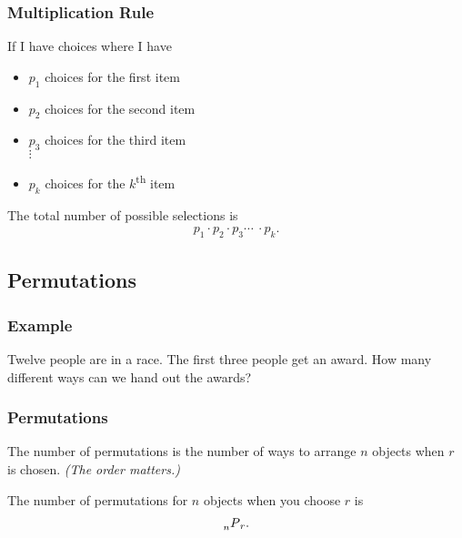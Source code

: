 \begin{frame}
  \frametitle{Multiplication Rule}

  \begin{definition}
    If I have choices where I have
    \begin{itemize}
    \item $p_1$ choices for the first item
    \item $p_2$ choices for the second item
    \item $p_3$ choices for the third item \\
      $\vdots$
    \item $p_k$ choices for the $k$\textsuperscript{th} item \\
    \end{itemize}

    The total number of possible selections is 
    \begin{eqnarray*}
      p_1 \cdot p_2 \cdot p_3 \cdots ~ \cdot p_k.
    \end{eqnarray*}

  \end{definition}

\end{frame}

\subsection{Permutations}

\begin{frame}
  \frametitle{Example}
  Twelve people are in a race. The first three people get an
  award. How many different ways can we hand out the awards?

  \vfill
\end{frame}

\begin{frame}
  \frametitle{Permutations}
  \begin{definition}[Permutations]
    The number of permutations is the number of ways to arrange $n$
    objects when $r$ is chosen. \textit{(The order matters.)}
  \end{definition}

  {
    \begin{definition}[Notation]
      The number of permutations for $n$ objects when you choose $r$
      is 
      \begin{eqnarray*}
        \prescript{~}{n}{P}_r.
      \end{eqnarray*}
    \end{definition}
  }

\end{frame}

